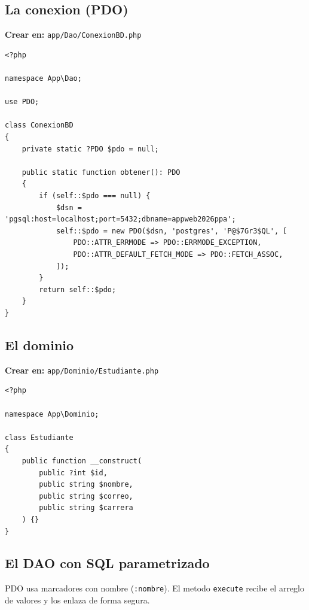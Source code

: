 \documentclass[11pt,a4paper,openany]{book}
\begin{document}
\subsection{La conexion (PDO)}
\label{ap:crud:laravel:conexion}

{\small\textbf{Crear en:} \texttt{app/Dao/ConexionBD.php}}
\begin{lstlisting}[style=php,caption={ConexionBD.php (conexion PDO reutilizable)},label={lst:lv-conexion}]
<?php

namespace App\Dao;

use PDO;

class ConexionBD
{
    private static ?PDO $pdo = null;

    public static function obtener(): PDO
    {
        if (self::$pdo === null) {
            $dsn = 'pgsql:host=localhost;port=5432;dbname=appweb2026ppa';
            self::$pdo = new PDO($dsn, 'postgres', 'P@$7Gr3$QL', [
                PDO::ATTR_ERRMODE => PDO::ERRMODE_EXCEPTION,
                PDO::ATTR_DEFAULT_FETCH_MODE => PDO::FETCH_ASSOC,
            ]);
        }
        return self::$pdo;
    }
}
\end{lstlisting}

\subsection{El dominio}
\label{ap:crud:laravel:dominio}

{\small\textbf{Crear en:} \texttt{app/Dominio/Estudiante.php}}
\begin{lstlisting}[style=php,caption={Estudiante.php (dominio con propiedades promovidas)},label={lst:lv-dominio}]
<?php

namespace App\Dominio;

class Estudiante
{
    public function __construct(
        public ?int $id,
        public string $nombre,
        public string $correo,
        public string $carrera
    ) {}
}
\end{lstlisting}

\subsection{El DAO con SQL parametrizado}
\label{ap:crud:laravel:dao}

PDO usa marcadores con nombre (\texttt{:nombre}). El metodo
\texttt{execute} recibe el arreglo de valores y los enlaza de forma
segura.
\end{document}

